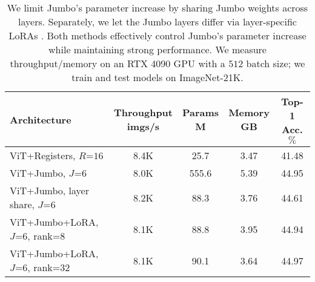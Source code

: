 \begin{table}[t]
    \centering
    \scriptsize
    \caption{We limit Jumbo's parameter increase by sharing Jumbo weights across layers. Separately, we let the Jumbo layers differ via layer-specific LoRAs \cite{hu2022lora}. Both methods effectively control Jumbo's parameter increase while maintaining strong performance. We measure throughput/memory on an RTX 4090 GPU with a $512$ batch size; we train and test models on ImageNet-21K.}
    \setlength{\tabcolsep}{2pt}
    \begin{tabular}{lcccc} 
        \toprule
        Architecture & \makecell{Throughput\\imgs/s} & \makecell{Params\\M} & \makecell{Memory\\GB} & \makecell{Top-1 Acc.\\$\%$} \\
         \midrule
            ViT+Registers, $R$=$16$ & 8.4K & 25.7 & 3.47 & 41.48 \\
            ViT+Jumbo, $J$=$6$ & 8.0K & 555.6 & 5.39 & 44.95 \\
            ViT+Jumbo, layer share, $J$=$6$ & 8.2K & 88.3 & 3.76 & 44.61 \\
            ViT+Jumbo+LoRA, $J$=$6$, rank=$8$ & 8.1K & 88.8 & 3.95 & 44.94 \\
            ViT+Jumbo+LoRA, $J$=$6$, rank=$32$ & 8.1K & 90.1 & 3.64 & 44.97 \\
         \bottomrule
    \end{tabular}
    \label{tab:bonus}
\end{table}
